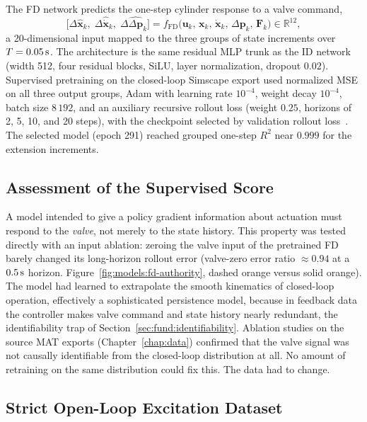 The FD network predicts the one-step cylinder response to a valve command,
%
\begin{equation}
  \label{eq:models:fd-contract}
  \bigl[\Delta\hat{\bm{x}}_k,\; \Delta\hat{\dot{\bm{x}}}_k,\;
        \Delta\widehat{\Delta\bm{p}}_k\bigr]
  = f_{\mathrm{FD}}\bigl(\bm{u}_k,\, \bm{x}_k,\, \dot{\bm{x}}_k,\,
    \Delta\bm{p}_k,\, \bm{F}_k\bigr) \in \mathbb{R}^{12},
\end{equation}
%
a 20-dimensional input mapped to the three groups of state increments over
$T=\unit[0.05]{s}$. The architecture is the same residual MLP trunk as the ID
network (width 512, four residual blocks, SiLU, layer normalization, dropout
$0.02$). Supervised pretraining on the closed-loop Simscape export used
normalized MSE on all three output groups, Adam with learning rate
$10^{-4}$, weight decay $10^{-4}$, batch size $8\,192$, and an auxiliary
recursive rollout loss (weight $0.25$, horizons of 2, 5, 10, and 20 steps),
with the checkpoint selected by validation rollout
loss~\cite{nagabandi2018neural}. The selected model (epoch 291) reached
grouped one-step $R^2$ near $0.999$ for the extension increments.

\subsection{Assessment of the Supervised Score}
\label{sec:models:fd-identifiability}

A model intended to give a policy gradient information about actuation must
respond to the \emph{valve}, not merely to the state history. This property
was tested directly with an input ablation: zeroing the valve input of the
pretrained FD barely changed its long-horizon rollout error
(valve-zero error ratio $\approx 0.94$ at a $\unit[0.5]{s}$ horizon.
Figure~\ref{fig:models:fd-authority}, dashed orange versus solid orange).
The model had learned to extrapolate the smooth kinematics of closed-loop operation,
effectively a sophisticated persistence model, because in feedback data the controller makes valve command and state history nearly
redundant, the identifiability trap of
Section~\ref{sec:fund:identifiability}. Ablation
studies on the source MAT exports (Chapter~\ref{chap:data}) confirmed that
the valve signal was not causally identifiable from the closed-loop
distribution at all. No amount of retraining on the same distribution could
fix this. The data had to change.

\subsection{Strict Open-Loop Excitation Dataset}
\label{sec:models:fd-strict}

